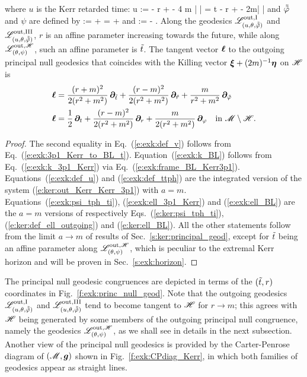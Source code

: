\begin{greybox}
\begin{itemize}
where $u$ is the Kerr retarded time:
\be \label{e:exk:def_u}
    u := \ti - r +  - 4 m \ln \left|  \right|
      = t  - r +  - 2m\ln\left|  \right|
\ee
and $\tilde{{\tilde\varphi}}$ and $\psi$ are defined by
\be \label{e:exk:def_ttph}
    \tilde{\tph} := \tph +  = \ph + 
\ee
and
\be \label{e:exk:psi_tph_ti}
    \psi := \tph -  .
\ee
Along the geodesics $\mathscr{L}^{\rm out, I}_{(u,\theta,\tilde{{\tilde\varphi}})}$ and $\mathscr{L}^{\rm out, III}_{(u,\theta,\tilde{{\tilde\varphi}})}$,
$r$ is an affine parameter increasing towards the future,
while along $\mathscr{L}^{{\rm out},\mathscr{H}}_{(\theta,\psi)}$, such an affine parameter is ${\tilde t}$. The tangent vector $\bm{\ell}$ to the outgoing principal null geodesics
that coincides with the Killing vector $\bm{\xi} + (2m)^{-1} \bm{\eta}$ on $\mathscr{H}$ is
\begin{subequations}
\begin{align}
 \bm{\ell} & = \frac{(r + m)^2}{2(r^2 + m^2)}\, \bm{\partial}_{{\tilde t}}
  + \frac{(r - m)^2}{2(r^2 + m^2)} \,  \bm{\partial}_{\tilde{r}}
  + \frac{m}{r^2 + m^2} \, \bm{\partial}_{{\tilde\varphi}} \label{e:exk:ell_3p1_Kerr}\\
 \bm{\ell} & =  \frac{1}{2}\, \bm{\partial}_t
            + \frac{(r - m)^2}{2(r^2 + m^2)} \,  \bm{\partial}_r
            + \frac{m}{2(r^2 + m^2)} \, \bm{\partial}_\varphi
            \quad \mbox{in}\ \mathscr{M}\setminus\mathscr{H} . \label{e:exk:ell_BL}
\end{align}
\end{subequations}
\end{itemize}
\end{greybox}
\begin{proof}
The second equality in Eq.~(\ref{e:exk:def_v}) follows from Eq.~(\ref{e:exk:3p1_Kerr_to_BL_t}).
Equation~(\ref{e:exk:k_BL}) follows from Eq.~(\ref{e:exk:k_3p1_Kerr}) via Eq.~(\ref{e:exk:frame_BL_Kerr3p1}).
Equations~(\ref{e:exk:def_u}) and (\ref{e:exk:def_ttph}) are the integrated version of the system (\ref{e:ker:out_Kerr_Kerr_3p1}) with $a=m$. Equations~(\ref{e:exk:psi_tph_ti}), (\ref{e:exk:ell_3p1_Kerr})
and (\ref{e:exk:ell_BL}) are the $a=m$ versions of respectively
Eqs.~(\ref{e:ker:psi_tph_ti}), (\ref{e:ker:def_ell_outgoing}) and (\ref{e:ker:ell_BL}).
All the other statements follow from the limit $a\to m$ of results of Sec.~\ref{s:ker:principal_geod},
except for ${\tilde t}$ being an affine parameter along $\mathscr{L}^{{\rm out},\mathscr{H}}_{(\theta,\psi)}$, which
is peculiar to the extremal Kerr horizon and will
be proven in Sec.~\ref{s:exk:horizon}.
\end{proof}

The principal null geodesic congruences are depicted in terms of the $({\tilde t}, r)$
coordinates in Fig.~\ref{f:exk:princ_null_geod}. Note that the outgoing geodesics
$\mathscr{L}^{\rm out, I}_{(u,\theta,\tilde{{\tilde\varphi}})}$ and $\mathscr{L}^{\rm out, III}_{(u,\theta,\tilde{{\tilde\varphi}})}$
tend to become tangent to $\mathscr{H}$ for $r\to m$; this agrees with $\mathscr{H}$ being
generated by some members of the outgoing principal null congruence, namely the geodesics
$\mathscr{L}^{{\rm out},\mathscr{H}}_{(\theta,\psi)}$, as we shall see in details in the next subsection.
Another view of the principal null geodesics is provided by the Carter-Penrose
diagram of $(\mathscr{M},\bm{g})$ shown in Fig.~\ref{f:exk:CPdiag_Kerr}, in which both
families of geodesics appear as straight lines.

